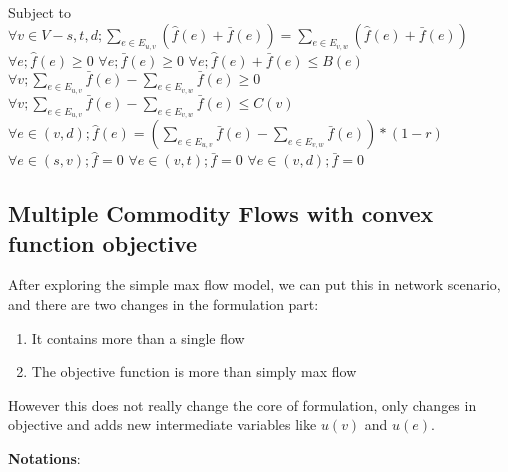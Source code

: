 \documentclass{sig-alternate}
\begin{document}
Subject to
\newline
$ \forall v \in V-{s, t, d}; \sum\limits_{e \in E_{u, v}} ( \hat{f}(e) +\bar{f}(e))= \sum\limits_{e \in E_{v, w} } (\hat{f}(e)+ \bar{f}(e))$
\newline
$\forall e; \hat{f}(e)\geq 0$
\newline
$\forall e; \bar{f}(e) \geq 0$
\newline
$\forall e; \hat{f}(e) + \bar{f}(e)\leq B(e)$
\newline
$\forall v;\sum\limits_{e \in E_{u, v}}  \bar{f}(e) - \sum\limits_{e \in E_{v, w} } \bar{f}(e)\geq 0 $ 
\newline
$\forall v; \sum\limits_{e \in E_{u, v}}  \bar{f}(e) - \sum\limits_{e \in E_{v, w} } \bar{f}(e)\leq C(v)$
\newline
$\forall e\in(v, d) ; \hat{f}(e) = (\sum\limits_{e \in E_{u, v}}  \bar{f}(e) - \sum\limits_{e \in E_{v, w} } \bar{f}(e))*(1-r)$
\newline
$\forall e\in (s,v); \hat{f}=0$
\newline
$\forall e\in (v,t); \bar{f}=0$
\newline
$\forall e\in (v,d); \bar{f}=0$
\newline



\subsection{Multiple Commodity Flows with convex function objective}
After exploring the simple max flow model, we can put this in network scenario, and there are two changes in the formulation part:
\begin{enumerate}
\item {It contains more than a single flow}
\item {The objective function is more than simply max flow}
\end{enumerate}

However this does not really change the core of formulation, only changes in objective and adds new intermediate variables like $u(v) $ and $u(e)$.
\newline


\textbf{Notations}:
\end{document}
